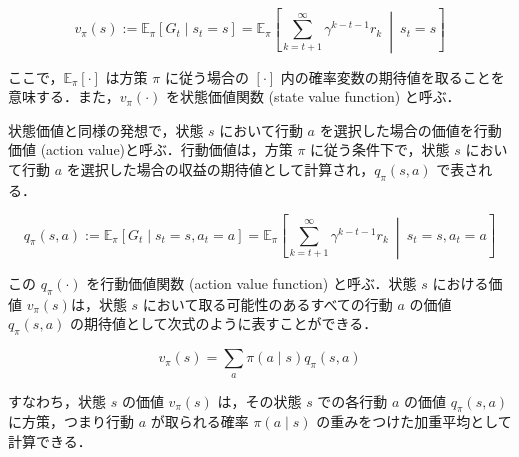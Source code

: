 \documentclass[titlepage]{ltjsbook}
\begin{document}
\begin{equation}
v_\pi(s) := \mathbb{E}_\pi \left[G_t \mid s_t = s \right]=\mathbb{E}_\pi \left[\sum_{k=t+1}^{\infty}\gamma^{k-t-1} r_{k}\ \middle|\ s_t = s \right]
\end{equation}

ここで，$\mathbb{E}_\pi \left[\cdot \right]$ は方策 $\pi$ に従う場合の $[\cdot]$ 内の確率変数の期待値を取ることを意味する．また，$v_\pi(\cdot)$ を状態価値関数 (state value function) と呼ぶ．

状態価値と同様の発想で，状態 $s$ において行動 $a$ を選択した場合の価値を行動価値 (action value)と呼ぶ．行動価値は，方策 $\pi$ に従う条件下で，状態 $s$ において行動 $a$ を選択した場合の収益の期待値として計算され，$q_\pi (s, a)$ で表される．

\begin{equation}
q_\pi(s, a) := \mathbb{E}_\pi \left[G_t \mid s_t = s, a_t=a \right]= \mathbb{E}_\pi \left[\sum_{k=t+1}^{\infty}\gamma^{k-t-1} r_{k}\ \middle|\ s_t = s, a_t=a \right]
\end{equation}

この $q_\pi (\cdot)$ を行動価値関数 (action value function) と呼ぶ．状態 $s$ における価値 $v_\pi(s)$は，状態 $s$ において取る可能性のあるすべての行動 $a$ の価値 $q_\pi(s, a)$ の期待値として次式のように表すことができる．

\begin{equation}
v_\pi(s) = \sum_{a} \pi(a \mid s) q_\pi(s, a)
\end{equation}

すなわち，状態 $s$ の価値 $v_\pi(s)$ は，その状態 $s$ での各行動 $a$ の価値 $q_\pi(s, a)$ に方策，つまり行動 $a$ が取られる確率 $\pi(a \mid s)$ の重みをつけた加重平均として計算できる．
\end{document}
